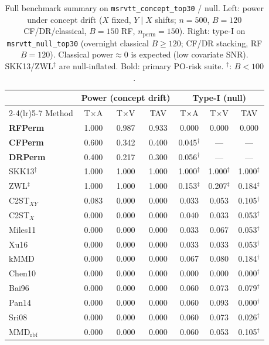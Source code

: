 \begin{table}[t]
\centering\scriptsize\setlength{\tabcolsep}{2.5pt}
\caption{Full benchmark summary on \texttt{msrvtt\_concept\_top30} / null.
  Left: power under concept drift ($X$ fixed, $Y\mid X$ shifts; $n=500$, $B=120$ CF/DR/classical, $B=150$ RF, $n_{\mathrm{perm}}=150$).
  Right: type-I on \texttt{msrvtt\_null\_top30} (overnight classical $B\ge 120$; CF/DR stacking, RF $B=120$).
  Classical power$\approx 0$ is expected (low covariate SNR). SKK13/ZWL$^\ddagger$ are null-inflated.
  Bold: primary PO-risk suite. $^\dagger$: $B<100$.}
\label{tab:full-benchmark-power-typeI}
\begin{tabular}{l ccc @{\hspace{1.0em}} ccc}
\toprule
& \multicolumn{3}{c}{\textbf{Power} (concept drift)} & \multicolumn{3}{c}{\textbf{Type-I} (null)} \\
\cmidrule(lr){2-4}\cmidrule(lr){5-7}
Method & T$\times$A & T$\times$V & TAV & T$\times$A & T$\times$V & TAV \\
\midrule
\textbf{RFPerm} & 1.000 & 0.987 & 0.933 & 0.000 & 0.000 & 0.000 \\
\textbf{CFPerm} & 0.600 & 0.342 & 0.400 & 0.045$^\dagger$ & --- & --- \\
\textbf{DRPerm} & 0.400 & 0.217 & 0.300 & 0.056$^\dagger$ & --- & --- \\
\midrule
SKK13$^\ddagger$ & 1.000 & 1.000 & 1.000 & 1.000$^\ddagger$ & 1.000$^\ddagger$ & 1.000$^\ddagger$ \\
ZWL$^\ddagger$ & 1.000 & 1.000 & 1.000 & 0.153$^\ddagger$ & 0.207$^\ddagger$ & 0.184$^\ddagger$ \\
C2ST$_{XY}$ & 0.083 & 0.000 & 0.000 & 0.033 & 0.053 & 0.105$^\dagger$ \\
C2ST$_X$ & 0.000 & 0.000 & 0.000 & 0.040 & 0.033 & 0.053$^\dagger$ \\
Miles11 & 0.000 & 0.000 & 0.000 & 0.033 & 0.067 & 0.053$^\dagger$ \\
Xu16 & 0.000 & 0.000 & 0.000 & 0.033 & 0.033 & 0.053$^\dagger$ \\
kMMD & 0.000 & 0.000 & 0.000 & 0.067 & 0.080 & 0.184$^\dagger$ \\
Chen10 & 0.000 & 0.000 & 0.000 & 0.000 & 0.000 & 0.000$^\dagger$ \\
Bai96 & 0.000 & 0.000 & 0.000 & 0.060 & 0.073 & 0.079$^\dagger$ \\
Pan14 & 0.000 & 0.000 & 0.000 & 0.060 & 0.093 & 0.000$^\dagger$ \\
Sri08 & 0.000 & 0.000 & 0.000 & 0.060 & 0.073 & 0.026$^\dagger$ \\
MMD$_{\mathrm{rbf}}$ & 0.000 & 0.000 & 0.000 & 0.060 & 0.053 & 0.105$^\dagger$ \\
\bottomrule
\end{tabular}
\vspace{2pt}{\footnotesize
$^\ddagger$ SKK13/ZWL: invalid (type-I$\approx 1$ on null).
 Classical$\approx 0$ under concept drift confirms low $X$-SNR; graded CF/DR/RF is the positive proof.}
\end{table}
